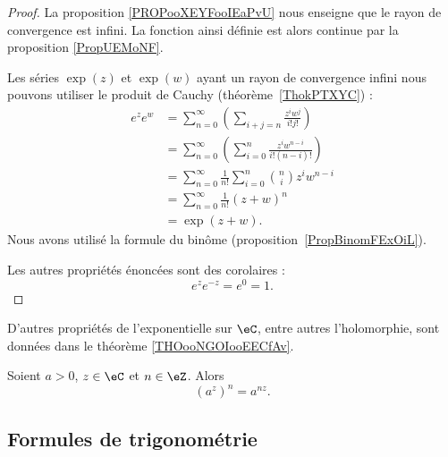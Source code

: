\begin{proof}
    La proposition \ref{PROPooXEYFooIEaPvU} nous enseigne que le rayon de convergence est infini. La fonction ainsi définie est alors continue par la proposition \ref{PropUEMoNF}.

    Les séries \( \exp(z)\) et \( \exp(w)\) ayant un rayon de convergence infini nous pouvons utiliser le produit de Cauchy (théorème~\ref{ThokPTXYC}) :
    \begin{subequations}
        \begin{align}
            e^{z} e^{w}&=\sum_{n=0}^{\infty}\left( \sum_{i+j=n}\frac{ z^iw^j }{ i!j! } \right)\\
            &=\sum_{n=0}^{\infty}\left( \sum_{i=0}^n\frac{ z^iw^{n-i} }{ i!(n-i)! } \right)\\
            &=\sum_{n=0}^{\infty}\frac{1}{ n! }\sum_{i=0}^{n}{n\choose i}z^iw^{n-i}\\
            &=\sum_{n=0}^{\infty}\frac{1}{ n! }(z+w)^{n}\\
            &=\exp(z+w).
        \end{align}
    \end{subequations}
    Nous avons utilisé la formule du binôme (proposition~\ref{PropBinomFExOiL}).

    Les autres propriétés énoncées sont des corolaires :
    \begin{equation}
        e^{z} e^{-z}= e^{0}=1.
    \end{equation}
\end{proof}

D'autres propriétés de l'exponentielle sur \( \eC\), entre autres l'holomorphie, sont données dans le théorème \ref{THOooNGOIooEECfAv}.


\begin{lemma}        \label{LEMooTDGKooWdpUTD}
    Soient \( a>0\), \( z\in \eC\) et \( n\in \eZ\). Alors
    \begin{equation}
        (a^z)^n=a^{nz}.
    \end{equation}
\end{lemma}

\subsection{Formules de trigonométrie}

